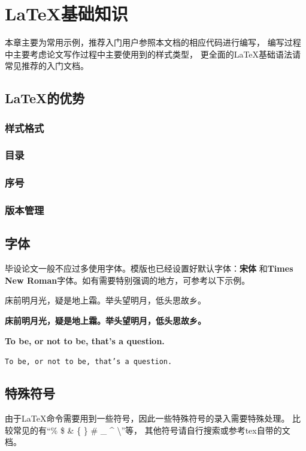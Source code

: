 \chapter{\LaTeX{}基础知识}
\label{chapter-basic}
本章主要为常用示例，推荐入门用户参照本文档的相应代码进行编写，
编写过程中主要考虑论文写作过程中主要使用到的样式类型，
更全面的\LaTeX{}基础语法请常见推荐的入门文档。

\section{\LaTeX{}的优势}
\label{sec-latex-advantage}

\subsection{样式格式}
\label{subsec-style}

\subsection{目录}
\label{subsec-contents}

\subsection{序号}
\label{subsec-order}

\subsection{版本管理}
\label{subsec-version-control}

\section{字体}
\label{sec-font}

毕设论文一般不应过多使用字体。模版也已经设置好默认字体：{\bf 宋体}
和{\bf Times New Roman}字体。如有需要特别强调的地方，可参考以下示例。

{\heiti 床前明月光，疑是地上霜。举头望明月，低头思故乡。}

{\bf 床前明月光，疑是地上霜。举头望明月，低头思故乡。}

\textbf{To be, or not to be, that's a question.}

\texttt{To be, or not to be, that's a question.}

\section{特殊符号}
\label{sec-symbol}
由于\LaTeX{}命令需要用到一些符号，因此一些特殊符号的录入需要特殊处理。
比较常见的有“\% \$ \& \{ \} \# \_ \^{} \textbackslash”等，
其他符号请自行搜索或参考tex自带的文档。

